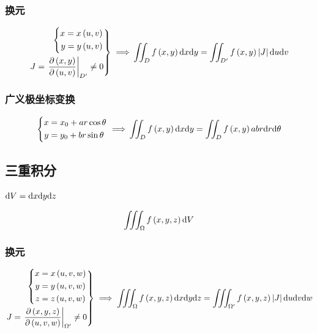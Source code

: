 \documentclass{article}
\begin{document}
\subsubsection{换元}

\[\left.\begin{aligned}
        \left\{\begin{aligned}
                   x=x\left(u,v\right) \\
                   y=y\left(u,v\right)
               \end{aligned}\right. \\
        J=\left.\frac{\partial\left(x,y\right)}{\partial\left(u,v\right)}\right|_{D^\prime}\neq0
    \end{aligned}\right\}\implies\\
    \iint_Df\left(x,y\right)\mathrm d x\mathrm d y=
    \iint_{D^\prime}f\left(x,y\right)\left|J\right|\mathrm d u\mathrm d v\]

\subsubsection{广义极坐标变换}

\[\left\{\begin{aligned}
        x & =x_0+ar\cos\theta \\
        y & =y_0+br\sin\theta
    \end{aligned}\right.\implies\\
    \iint_Df\left(x,y\right)\mathrm d x\mathrm d y=
    \iint_Df\left(x,y\right)abr\mathrm d r\mathrm d\theta\]

\subsection{三重积分}

$\mathrm d V=\mathrm d x\mathrm d y\mathrm d z$

\[\iiint_\Omega f\left(x,y,z\right)\mathrm d V\]

\subsubsection{换元}

\[\left.\begin{aligned}
        \left\{\begin{aligned}
                   x & =x\left(u,v,w\right) \\
                   y & =y\left(u,v,w\right) \\
                   z & =z\left(u,v,w\right)
               \end{aligned}\right. \\
        J=\left.\frac{\partial\left(x,y,z\right)}{\partial\left(u,v,w\right)}\right|_{\Omega^\prime}\neq0
    \end{aligned}\right\}\implies
    \iiint_\Omega f\left(x,y,z\right)\mathrm d x\mathrm d y\mathrm d z=
    \iiint_{\Omega^\prime}f\left(x,y,z\right)\left|J\right|\mathrm d u\mathrm d v\mathrm d w\]
\end{document}
